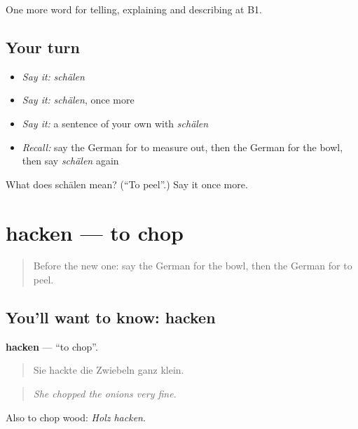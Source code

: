 \begin{grammarlens}[title={What you've built}]
One more word for telling, explaining and describing at B1.
\end{grammarlens}

\subsection*{Your turn}
\begin{itemize}
\raggedright
  \item \emph{Say it:} \emph{schälen}
  \item \emph{Say it:} \emph{schälen}, once more
  \item \emph{Say it:} a sentence of your own with \emph{schälen}
  \item \emph{Recall:} say the German for to measure out, then the German for the bowl, then say \emph{schälen} again
\end{itemize}

\begin{tcolorbox}[breakable,colback=teal!4,colframe=teal!35!black,title={Before you move on}]
What does schälen mean? (\textquotedblleft{}To peel\textquotedblright{}.) Say it once more.
\end{tcolorbox}
\section[hacken]{hacken — to chop}

\label{lesson:GE-C323-hacken}



\begin{quote}
Before the new one: say the German for the bowl, then the German for to peel.
\end{quote}

\subsection*{You'll want to know: hacken}
\textbf{hacken} — \textquotedblleft{}to chop\textquotedblright{}.

\begin{quote}
Sie hackte die Zwiebeln ganz klein.
\end{quote}

\begin{quote}
\emph{She chopped the onions very fine.}
\end{quote}

Also to chop wood: \emph{Holz hacken}.

